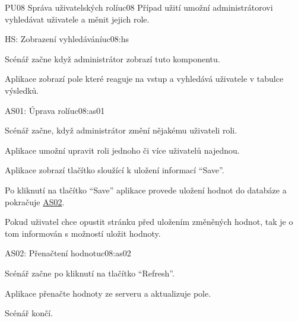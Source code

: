 \begin{usecase}{PU08 Správa uživatelských rolí}{uc08}
    Případ užití umožní administrátorovi vyhledávat uživatele a měnit jejich role.

    \begin{scenario}{HS: Zobrazení vyhledávání}{uc08:hs}
        \item Scénář začne když administrátor zobrazí tuto komponentu.
        \item Aplikace zobrazí pole které reaguje na vstup a vyhledává uživatele v tabulce výsledků.
    \end{scenario}

    \begin{scenario}{AS01: Úprava rolí}{uc08:as01}
        \item Scénář začne, když administrátor změní nějakému uživateli roli.
        \item Aplikace umožní upravit roli jednoho či více uživatelů najednou.
        \item Aplikace zobrazí tlačítko sloužící k uložení informací \enquote{Save}.
        \item Po kliknutí na tlačítko \enquote{Save} aplikace provede uložení hodnot do databáze a pokračuje \hyperref[uc02:as02]{AS02}.
        \item Pokud uživatel chce opustit stránku před uložením změněných hodnot, tak je o tom informován s možností uložit hodnoty.
    \end{scenario}

    \begin{scenario}{AS02: Přenačtení hodnot}{uc08:as02}
        \item Scénář začne po kliknutí na tlačítko \enquote{Refresh}.
        \item Aplikace přenačte hodnoty ze serveru a aktualizuje pole.
        \item Scénář končí.
    \end{scenario}
\end{usecase}
